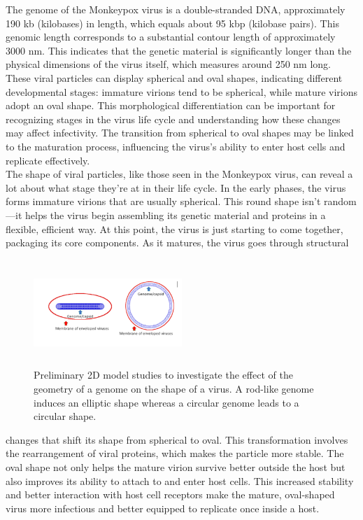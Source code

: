 \documentclass[12pt]{article}
\begin{document}
\begin{flushleft}
The genome of the Monkeypox virus is a double-stranded DNA, approximately 190 kb (kilobases) in length, which equals about 95 kbp (kilobase pairs). This genomic length corresponds to a substantial contour length of approximately 3000 nm. This indicates that the genetic material is significantly longer than the physical dimensions of the virus itself, which measures around 250 nm long. 
These viral particles can display spherical and oval shapes, indicating different developmental stages: immature virions tend to be spherical, while mature virions adopt an oval shape. This morphological differentiation can be important for recognizing stages in the virus life cycle and understanding how these changes may affect infectivity. The transition from spherical to oval shapes may be linked to the maturation process, influencing the virus's ability to enter host cells and replicate effectively.\\

The shape of viral particles, like those seen in the Monkeypox virus, can reveal a lot about what stage they’re at in their life cycle. In the early phases, the virus forms immature virions that are usually spherical. This round shape isn’t random—it helps the virus begin assembling its genetic material and proteins in a flexible, efficient way. At this point, the virus is just starting to come together, packaging its core components. As it matures, the virus goes through structural 

\begin{figure}[!ht]
  \centering
  \includegraphics[width=0.5\textwidth,height=4cm]{monkeypox.png}  %
  \caption{Preliminary 2D model studies to
investigate the effect of the geometry of a
genome on the shape of a virus. A rod-like
genome induces an elliptic shape whereas a
circular genome leads to a circular shape.}
\end{figure}

\noindent changes that shift its shape from spherical to oval. This transformation involves the rearrangement of viral proteins, which makes the particle more stable. The oval shape not only helps the mature virion survive better outside the host but also improves its ability to attach to and enter host cells. This increased stability and better interaction with host cell receptors make the mature, oval-shaped virus more infectious and better equipped to replicate once inside a host.





\end{flushleft}
\end{document}
